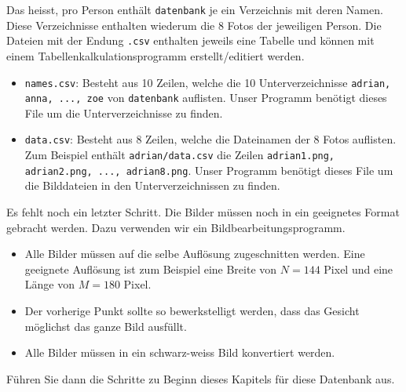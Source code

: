 Das heisst, pro Person enthält \texttt{datenbank} je ein Verzeichnis mit deren Namen.
Diese Verzeichnisse enthalten wiederum die 8 Fotos der jeweiligen Person.
Die Dateien mit der Endung \texttt{.csv} enthalten jeweils eine Tabelle und können mit einem Tabellenkalkulationsprogramm erstellt/editiert werden.
\begin{itemize}
	\item \texttt{names.csv}: Besteht aus 10 Zeilen, welche die 10 Unterverzeichnisse \texttt{adrian, anna, ..., zoe} von \texttt{datenbank} auflisten.
	Unser Programm benötigt dieses File um die Unterverzeichnisse zu finden.
	\item \texttt{data.csv}: Besteht aus 8 Zeilen, welche die Dateinamen der 8 Fotos auflisten.
	Zum Beispiel enthält \texttt{adrian/data.csv} die Zeilen \texttt{adrian1.png, adrian2.png, ..., adrian8.png}.
	Unser Programm benötigt dieses File um die Bilddateien in den Unterverzeichnissen zu finden.
\end{itemize}
Es fehlt noch ein letzter Schritt.
Die Bilder müssen noch in ein geeignetes Format gebracht werden.
Dazu verwenden wir ein Bildbearbeitungsprogramm.
\begin{itemize}
	\item Alle Bilder müssen auf die selbe Auflösung zugeschnitten werden.
	Eine geeignete Auflösung ist zum Beispiel eine Breite von $N=144$ Pixel und eine Länge von $M=180$ Pixel.
	\item Der vorherige Punkt sollte so bewerkstelligt werden, dass das Gesicht möglichst das ganze Bild ausfüllt.
	\item Alle Bilder müssen in ein schwarz-weiss Bild konvertiert werden.
\end{itemize}
Führen Sie dann die Schritte zu Beginn dieses Kapitels für diese Datenbank aus.
